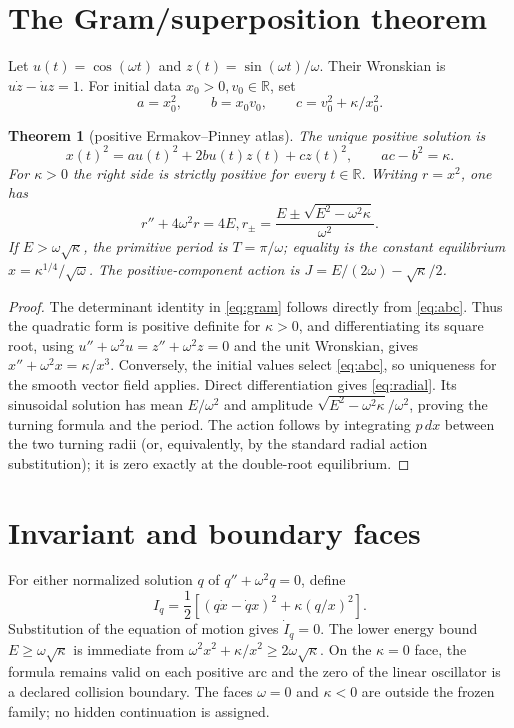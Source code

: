 \documentclass[10pt]{article}
\newtheorem{theorem}{Theorem}
\newcommand{\R}{\mathbb R}
\begin{document}
\section{The Gram/superposition theorem}
Let $u(t)=\cos(\omega t)$ and $z(t)=\sin(\omega t)/\omega$.  Their Wronskian is
$u\dot z-\dot u z=1$.  For initial data $x_0>0,v_0\in\R$, set
\begin{equation}
 a=x_0^2,\qquad b=x_0v_0,\qquad c=v_0^2+\kappa/x_0^2.
 \label{eq:abc}
\end{equation}
\begin{theorem}[positive Ermakov--Pinney atlas]
The unique positive solution is
\begin{equation}
 x(t)^2=a u(t)^2+2b u(t)z(t)+c z(t)^2,\qquad ac-b^2=\kappa.
 \label{eq:gram}
\end{equation}
For $\kappa>0$ the right side is strictly positive for every $t\in\R$.
Writing $r=x^2$, one has
\begin{equation}
 r''+4\omega^2r=4E,
 \label{eq:radial}
 r_\pm=\frac{E\pm\sqrt{E^2-\omega^2\kappa}}{\omega^2}.
\end{equation}
If $E>\omega\sqrt\kappa$, the primitive period is $T=\pi/\omega$; equality
is the constant equilibrium $x=\kappa^{1/4}/\sqrt\omega$.  The positive-component
action is $J=E/(2\omega)-\sqrt\kappa/2$.
\end{theorem}
\begin{proof}
The determinant identity in \eqref{eq:gram} follows directly from \eqref{eq:abc}.  Thus the quadratic
form is positive definite for $\kappa>0$, and differentiating its square root,
using $u''+\omega^2u=z''+\omega^2z=0$ and the unit Wronskian, gives
$x''+\omega^2x=\kappa/x^3$.  Conversely, the initial values select \eqref{eq:abc}, so
uniqueness for the smooth vector field applies.  Direct differentiation gives
\eqref{eq:radial}.  Its sinusoidal solution has mean $E/\omega^2$ and
amplitude $\sqrt{E^2-\omega^2\kappa}/\omega^2$, proving the turning formula and the period.
The action follows by integrating $p\,dx$ between the two turning radii (or,
equivalently, by the standard radial action substitution); it is zero exactly
at the double-root equilibrium.
\end{proof}

\section{Invariant and boundary faces}
For either normalized solution $q$ of $q''+\omega^2q=0$, define
\begin{equation}
 I_q=\frac12\left[(q\dot x-\dot q x)^2+\kappa(q/x)^2\right].
 \label{eq:inv}
\end{equation}
Substitution of the equation of motion gives $\dot I_q=0$.  The lower energy
bound $E\geq\omega\sqrt\kappa$ is immediate from
$\omega^2x^2+\kappa/x^2\geq2\omega\sqrt\kappa$.  On the $\kappa=0$ face,
the formula remains valid on each positive arc and the zero of the linear
oscillator is a declared collision boundary.  The faces $\omega=0$ and
$\kappa<0$ are outside the frozen family; no hidden continuation is assigned.
\end{document}
